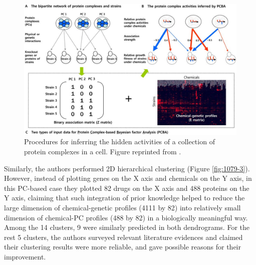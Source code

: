 \documentclass[12pt,fullpage,singlespace]{article}
\begin{document}
\begin{figure}
\centering
\includegraphics[width=\linewidth]{1079-2.png}
\caption{Procedures for inferring the hidden activities of a collection of protein complexes in a cell. Figure reprinted from \citep{1079}.}
\label{fig:1079-2}
\end{figure}

Similarly, the authors performed 2D hierarchical clustering (Figure \ref{fig:1079-3}). However, instead of plotting genes on the X axis and chemicals on the Y axis, in this PC-based case they plotted 82 drugs on the X axis and 488 proteins on the Y axis, claiming that such integration of prior knowledge helped to reduce the large dimension of chemical-genetic profiles (4111 by 82) into relatively small dimension of chemical-PC profiles (488 by 82) in a biologically meaningful way. Among the 14 clusters, 9 were similarly predicted in both dendrograms. For the rest 5 clusters, the authors surveyed relevant literature evidences and claimed their clustering results were more reliable, and gave possible reasons for their improvement.
\end{document}
